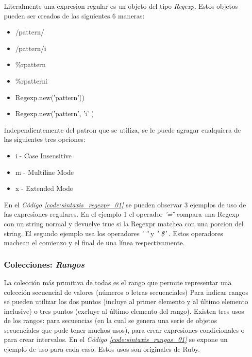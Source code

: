 \documentclass{article}
\newcommand{\refcode}[1]{\textit{Código \ref{#1}}}
\begin{document}
	Literalmente una expresion regular es un objeto del tipo \textit{Regexp}. Estos objetos pueden ser creados de las siguientes 6 maneras:

\begin{itemize}
	\itemsep=1pt \topsep=0pt \partopsep=0pt \parskip=0pt \parsep=0pt
	\item  /pattern/              
	\item  /pattern/i 
	\item  \%r{pattern}
	\item \%r{pattern}i
	\item  Regexp.new('pattern'))
	\item  Regexp.new('pattern', 'i' )
\end{itemize}

	Independientemente del patron que se utiliza, se le puede agragar cualquiera de las siguientes tres opciones:

\begin{itemize}
	\itemsep=1pt \topsep=0pt \partopsep=0pt \parskip=0pt \parsep=0pt
	 \item  i  - Case Insensitive
	 \item m  - Multiline Mode
	 \item x  - Extended Mode
\end{itemize}
	
\noindent En el \refcode{code:sintaxis_regexpr_01} se pueden observar 3 ejemplos de uso de las expresiones regulares. En el ejemplo 1 el operador \textit{ '=\~'}  compara una Regexp con un string normal y devuelve true si la Regexpr matchea con una porcion del string. El segundo ejemplo usa los operadores \textit{' \^'} y \textit{ ' \$'} . Estos operadores machean el comienzo y el final de una línea respectivamente.

 
\bigskip



\subsubsection{Colecciones: \textit{Rangos}}
La colección más primitiva de todas es el rango que permite representar una colección secuencial de valores (números o letras secuenciales)
Para indicar rangos se pueden utilizar los dos puntos (incluye al primer elemento y al último elemento inclusive) o tres puntos (excluye al último elemento del rango).
Existen tres usos de los rangos:  para secuencias (en la cual se genera una serie de objetos secuenciales que pude tener muchos usos), para crear expresiones condicionales o para crear intervalos. En el \refcode{code:sintaxis_rangos_01}  se expone un ejemplo de uso para cada caso. Estos usos son originales de Ruby.
\end{document}
